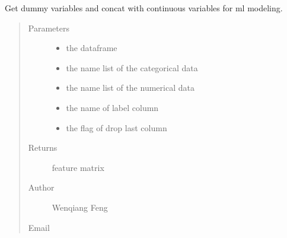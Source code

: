 \documentclass[letterpaper,11pt,english]{sphinxmanual}
\begin{document}
\begin{fulllineitems}
\begin{fulllineitems}
\end{fulllineitems}


\begin{fulllineitems}
\label{\detokenize{auto_feature:AutoFeatures.AutoFeatures.get_dummy}}
Get dummy variables and concat with continuous variables for ml modeling.
\begin{quote}\begin{description}
\item[{Parameters}] \leavevmode\begin{itemize}
\item {} 
 \textendash{} the dataframe

\item {} 
 \textendash{} the name list of the categorical data

\item {} 
 \textendash{} the name list of the numerical data

\item {} 
 \textendash{} the name of label column

\item {} 
 \textendash{} the flag of drop last column

\end{itemize}

\item[{Returns}] \leavevmode
feature matrix

\item[{Author}] \leavevmode
Wenqiang Feng

\item[{Email}] \leavevmode
{}

\end{description}\end{quote}


\end{fulllineitems}
\end{fulllineitems}
\end{document}
